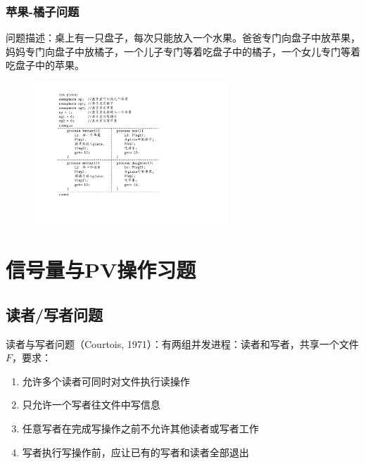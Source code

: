 \documentclass[cs4size,a4paper,10pt]{ctexart}
\begin{document}
	\subsubsection{苹果-橘子问题}
	问题描述：桌上有一只盘子，每次只能放入一个水果。爸爸专门向盘子中放苹果，妈妈专门向盘子中放橘子，一个儿子专门等着吃盘子中的橘子，一个女儿专门等着吃盘子中的苹果。

	\begin{figure}[H]
		\centering
		\includegraphics[width=0.65\textwidth]{img/苹果-橘子问题.pdf}
	\end{figure}

	\section{信号量与PV操作习题}

	\subsection{读者/写者问题}
	读者与写者问题（Courtois, 1971）：有两组并发进程：读者和写者，共享一个文件$F$，要求：
	\begin{enumerate}[label=\arabic*.]
		\item 允许多个读者可同时对文件执行读操作
		\item 只允许一个写者往文件中写信息
		\item 任意写者在完成写操作之前不允许其他读者或写者工作
		\item 写者执行写操作前，应让已有的写者和读者全部退出
	\end{enumerate}
\end{document}
